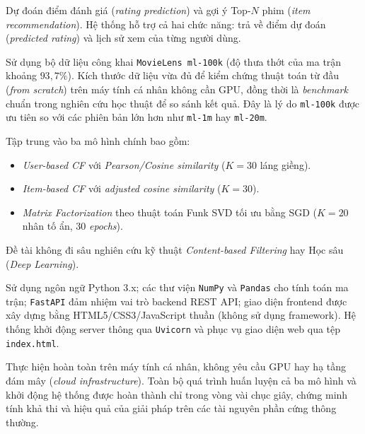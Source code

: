 \documentclass[../BTL.tex]{subfiles}
\begin{document}
\begin{description}[leftmargin=1.5em, itemsep=0.8em]
    \item[\textbf{Bài toán:}] Dự đoán điểm đánh giá (\textit{rating prediction}) và gợi ý Top-$N$ phim (\textit{item recommendation}). Hệ thống hỗ trợ cả hai chức năng: trả về điểm dự đoán (\textit{predicted rating}) và lịch sử xem của từng người dùng.
    
    \item[\textbf{Dữ liệu:}] Sử dụng bộ dữ liệu công khai \texttt{MovieLens ml-100k} (độ thưa thớt của ma trận khoảng $93,7\%$). Kích thước dữ liệu vừa đủ để kiểm chứng thuật toán từ đầu (\textit{from scratch}) trên máy tính cá nhân không cần GPU, đồng thời là \textit{benchmark} chuẩn trong nghiên cứu học thuật để so sánh kết quả. Đây là lý do \texttt{ml-100k} được ưu tiên so với các phiên bản lớn hơn như \texttt{ml-1m} hay \texttt{ml-20m}.
    
    \item[\textbf{Phương pháp:}] Tập trung vào ba mô hình chính bao gồm:
    \begin{itemize}[itemsep=0.3em]
        \item \textit{User-based CF} với \textit{Pearson/Cosine similarity} ($K=30$ láng giềng).
        \item \textit{Item-based CF} với \textit{adjusted cosine similarity} ($K=30$).
        \item \textit{Matrix Factorization} theo thuật toán Funk SVD tối ưu bằng SGD ($K=20$ nhân tố ẩn, $30$ \textit{epochs}).
    \end{itemize}
    Đề tài không đi sâu nghiên cứu kỹ thuật \textit{Content-based Filtering} hay Học sâu (\textit{Deep Learning}).
    
    \item[\textbf{Ngôn ngữ và công nghệ:}] Sử dụng ngôn ngữ Python 3.x; các thư viện \texttt{NumPy} và \texttt{Pandas} cho tính toán ma trận; \texttt{FastAPI} đảm nhiệm vai trò backend REST API; giao diện frontend được xây dựng bằng HTML5/CSS3/JavaScript thuần (không sử dụng framework). Hệ thống khởi động server thông qua \texttt{Uvicorn} và phục vụ giao diện web qua tệp \texttt{index.html}.
    
    \item[\textbf{Môi trường triển khai:}] Thực hiện hoàn toàn trên máy tính cá nhân, không yêu cầu GPU hay hạ tầng đám mây (\textit{cloud infrastructure}). Toàn bộ quá trình huấn luyện cả ba mô hình và khởi động hệ thống được hoàn thành chỉ trong vòng vài chục giây, chứng minh tính khả thi và hiệu quả của giải pháp trên các tài nguyên phần cứng thông thường.
\end{description}
\end{document}
